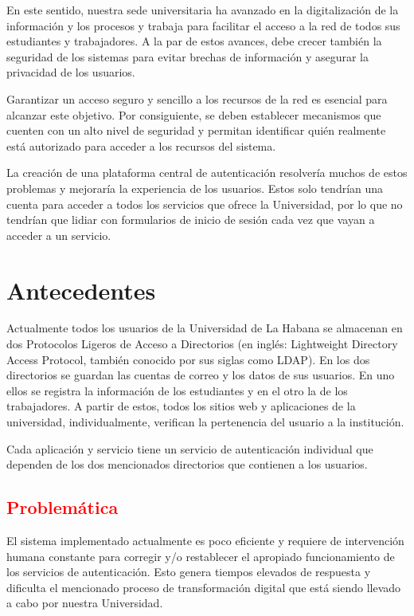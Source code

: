 En este sentido, nuestra sede universitaria ha avanzado en la digitalización de la información y los procesos y trabaja para facilitar el acceso a la red de todos sus estudiantes y trabajadores. A la par de estos avances, debe crecer también la seguridad de los sistemas para evitar brechas de información y asegurar la privacidad de los usuarios.

Garantizar un acceso seguro y sencillo a los recursos de la red es esencial para alcanzar este objetivo. Por consiguiente, se deben establecer mecanismos que cuenten con un alto nivel de seguridad y permitan identificar quién realmente está autorizado para acceder a los recursos del sistema.

La creación de una plataforma central de autenticación resolvería muchos de estos problemas y mejoraría la experiencia de los usuarios. Estos solo tendrían una cuenta para acceder a todos los servicios que ofrece la Universidad, por lo que no tendrían que lidiar con formularios de inicio de sesión cada vez que vayan a acceder a un servicio.


\section*{Antecedentes}

Actualmente todos los usuarios de la Universidad de La Habana se almacenan en dos Protocolos Ligeros de Acceso a Directorios (en inglés: Lightweight Directory Access Protocol, también conocido por sus siglas como LDAP). En los dos directorios se guardan las cuentas de correo y los datos de sus usuarios. En uno ellos se registra la información de los estudiantes y en el otro la de los trabajadores. A partir de estos, todos los sitios web y aplicaciones de la universidad, individualmente, verifican la pertenencia del usuario a la institución.

Cada aplicación y servicio tiene un servicio de autenticación individual que dependen de los dos mencionados directorios que contienen a los usuarios.

\textcolor{red}{ \section*{Problemática}}
El sistema implementado actualmente es poco eficiente y requiere de intervención humana constante para corregir y/o restablecer el apropiado funcionamiento de los servicios de autenticación. Esto genera tiempos elevados de respuesta y dificulta el mencionado proceso de transformación digital que está siendo llevado a cabo por nuestra Universidad.

